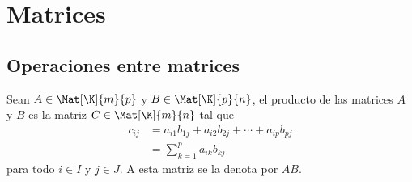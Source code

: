 \documentclass[compacto,10pt]{pubciencias-notas}
\begin{document}
\encabezado

\vspace{-8mm}

\section{Matrices}
\setcounter{subsection}{1}
\subsection{Operaciones entre matrices}

\begin{defi}\label{Sem01Clas01DefMultMAt}
    Sean $A \in \Mat[\K]{m}{p}$ y $B \in \Mat[\K]{p}{n}$, el producto de las matrices $A$ y $B$ es la matriz $C \in \Mat[\K]{m}{n}$ tal que
    \begin{align*}
        c_{ij} & = a_{i1}b_{1j} + a_{i2} b_{2j} + \cdots + a_{ip}b_{pj} \\
               & = \sum_{k=1}^p a_{ik} b_{kj}
    \end{align*}
    para todo $i \in I$ y $j \in J$. A esta matriz se la denota por $AB$.
\end{defi}
\end{document}
